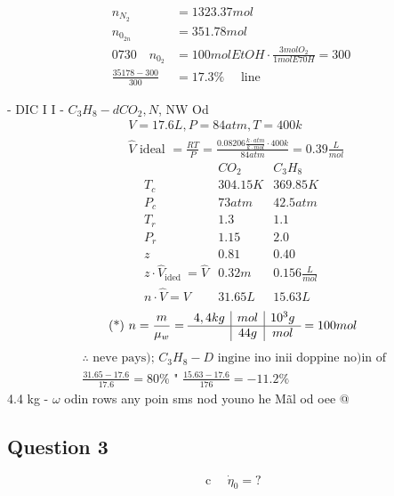 \documentclass[12pt]{article}
\begin{document}
\[
\begin{aligned}
n_{N_{2}} & =1323.37 mol \\
n_{0_{2 n}} & =351.78 mol \\
0730 \quad n_{0_{2}} & =100 mol EtOH \cdot \frac{3 mol O_{2}}{1 mol E 70 H}=300 \\
\frac{35178-300}{300} & =17.3 \% \quad \text { line }
\end{aligned}
\]

-
DIC I I - \(C _{3} H _{8}- d CO _{2}, N\), NW Od
\[
\begin{aligned}
& V=17.6 L, P=84 atm, T=400 k \\
& \hat{V} \text { ideal }=\frac{R T}{P}=\frac{0.08206 \frac{k \cdot atm}{k \cdot mol} \cdot 400 k}{84 atm}=0.39 \frac{L}{mol}
\end{aligned}
\]
\[
\begin{array}{rcc}
& CO_{2} & C_{3} H_{8} \\
T_{c} & 304.15 K & 369.85 K \\
P_{c} & 73 atm & 42.5 atm \\
T_{r} & 1.3 & 1.1 \\
P_{r} & 1.15 & 2.0 \\
z & 0.81 & 0.40 \\
z \cdot \hat{V}_{\text {ided }}=\hat{V} & 0.32 m & 0.156 \frac{L}{mol} \\
n \cdot \hat{V}=V & 31.65 L & 15.63 L
\end{array}
\]
\[
\text { (*) } n=\frac{m}{\mu_{w}}=\begin{array}{c|c|c}
4,4 kg & mol & 10^{3} g \\
\hline & 44 g & mol
\end{array}=100 mol
\]
\[
\begin{aligned}
& \therefore \text { neve pays); } C_{3} H_{8}-D \text { ingine ino inii doppine no)in of } \\
& \frac{31.65-17.6}{17.6}=80 \% \text { " } \frac{15.63-17.6}{176}=-11.2 \%
\end{aligned}
\]
4.4 kg - \(\omega\) odin rows any poin sms nod youno he Mãl od oee @

\subsection*{Question 3}

\[
\text { c } \quad \dot{\eta}_{0}=?
\]
\end{document}
